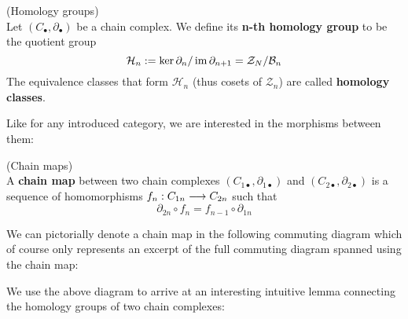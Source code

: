 \begin{definition}
\label{def:Homology}
(Homology groups)\\
  Let $(C_\bullet, \partial_\bullet)$ be a chain complex. We define its \textbf{n-th homology group} to be the quotient group
  $$ \mathcal{H}_n := \ker\partial_n / \operatorname{im} \partial_{n+1} = \mathcal{Z}_N / \mathcal{B}_n $$
  The equivalence classes that form $\mathcal{H}_n$ (thus cosets of $\mathcal{Z}_n$) are called \textbf{homology classes}.
\end{definition}

Like for any introduced category, we are interested in the morphisms between them:

\begin{definition}
\label{def:chain_map}
(Chain maps)\\
  A \textbf{chain map} between two chain complexes $(C_{1\bullet}, \partial_{1\bullet})$ and $(C_{2\bullet}, \partial_{2\bullet})$ is a sequence of homomorphisms $f_n: C_{1n} \longrightarrow C_{2n}$ such that
  $$ \partial_{2n} \circ f_n = f_{n-1} \circ \partial_{1n} $$
\end{definition}

We can pictorially denote a chain map in the following commuting diagram which of course only represents an excerpt of the full commuting diagram spanned using the chain map:

\begin{center}
\end{center}


We use the above diagram to arrive at an interesting intuitive lemma connecting the homology groups of two chain complexes:

